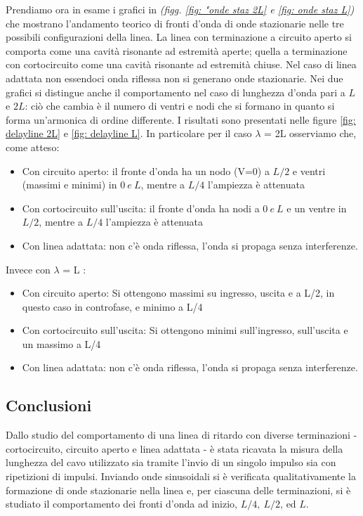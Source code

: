 \documentclass[journal]{IEEEtran}
\begin{document}
Prendiamo ora in esame i grafici in \textit{(figg. \ref{fig: "onde staz 2L} e \ref{fig: onde staz L})} che mostrano l'andamento teorico di fronti d'onda di onde stazionarie nelle tre possibili configurazioni della linea.
La linea con terminazione a circuito aperto si comporta come una cavità risonante ad estremità aperte; quella a terminazione con cortocircuito come una cavità risonante ad estremità chiuse. Nel caso di linea adattata non essendoci onda riflessa non si generano onde stazionarie. Nei due grafici si distingue anche il comportamento nel caso di lunghezza d'onda pari a $L$ e $2L$: ciò che cambia è il numero di ventri e nodi che si formano in quanto si forma un'armonica di ordine differente. I risultati sono presentati nelle figure \ref{fig: delayline 2L} e \ref{fig: delayline L}. In particolare per il caso $\lambda$ = 2L osserviamo che, come atteso:
\begin{itemize}
    \item Con circuito aperto: il fronte d'onda ha un nodo (V=0) a $L/2$ e ventri (massimi e minimi) in $0 \ e\ L$, mentre a $L/4$ l'ampiezza è attenuata 
    \item Con cortocircuito sull'uscita: il fronte d'onda ha nodi a $0\ e\ L$ e un ventre in $L/2$, mentre a $L/4$ l'ampiezza è attenuata
    \item Con linea adattata: non c'è onda riflessa, l'onda si propaga senza interferenze.
\end{itemize}
Invece con $\lambda$ = L :
\begin{itemize}
    \item Con circuito aperto: Si ottengono massimi su ingresso, uscita e a L/2, in questo caso in controfase, e minimo a L/4
    \item Con cortocircuito sull'uscita: Si ottengono minimi sull'ingresso, sull'uscita e un massimo a L/4
    \item Con linea adattata: non c'è onda riflessa, l'onda si propaga senza interferenze.
\end{itemize}

\subsection{Conclusioni}
Dallo studio del comportamento di una linea di ritardo con diverse terminazioni - cortocircuito, circuito aperto e linea adattata - è stata ricavata la misura della lunghezza del cavo utilizzato sia tramite l'invio di un singolo impulso sia con ripetizioni di impulsi. Inviando onde sinusoidali si è verificata qualitativamente la formazione di onde stazionarie nella linea e, per ciascuna delle terminazioni, si è studiato il comportamento dei fronti d'onda ad inizio, $L/4, \ L/2$, ed $L$. 
\end{document}
